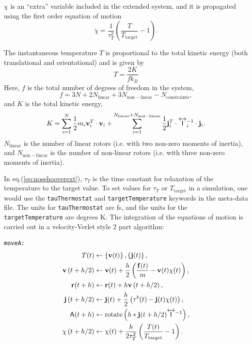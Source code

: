 \documentclass[letterpaper]{report}
\begin{document}
$\chi$ is an ``extra'' variable included in the extended system, and
it is propagated using the first order equation of motion
\begin{equation}
\dot{\chi} = \frac{1}{\tau_{T}^2} \left( \frac{T}{T_{\mathrm{target}}} - 1 \right).
\label{eq:nosehooverext}
\end{equation}

The instantaneous temperature $T$ is proportional to the total kinetic
energy (both translational and orientational) and is given by
\begin{equation}
T = \frac{2 K}{f k_B}
\end{equation}
Here, $f$ is the total number of degrees of freedom in the system,
\begin{equation}
f = 3 N + 2 N_{\mathrm{linear}} + 3 N_{\mathrm{non-linear}} - N_{\mathrm{constraints}},
\end{equation}
and $K$ is the total kinetic energy,
\begin{equation}
K = \sum_{i=1}^{N} \frac{1}{2} m_i {\bf v}_i^T \cdot {\bf v}_i +
\sum_{i=1}^{N_{\mathrm{linear}}+N_{\mathrm{non-linear}}}  \frac{1}{2} {\bf j}_i^T \cdot
\overleftrightarrow{\mathsf{I}}_i^{-1} \cdot {\bf j}_i.
\end{equation}
$N_{\mathrm{linear}}$ is the number of linear rotors (i.e. with two
non-zero moments of inertia), and $N_{\mathrm{non-linear}}$ is the
number of non-linear rotors (i.e. with three non-zero moments of
inertia).  

In eq.(\ref{eq:nosehooverext}), $\tau_T$ is the time constant for
relaxation of the temperature to the target value.  To set values for
$\tau_T$ or $T_{\mathrm{target}}$ in a simulation, one would use the
{\tt tauThermostat} and {\tt targetTemperature} keywords in the
meta-data file.  The units for {\tt tauThermostat} are fs, and the
units for the {\tt targetTemperature} are degrees K.   The integration
of the equations of motion is carried out in a velocity-Verlet style 2
part algorithm:

{\tt moveA:}
\begin{align*}
T(t) &\leftarrow \left\{{\bf v}(t)\right\}, \left\{{\bf j}(t)\right\} ,\\
%
{\bf v}\left(t + h / 2\right)  &\leftarrow {\bf v}(t) 
	+ \frac{h}{2} \left( \frac{{\bf f}(t)}{m} - {\bf v}(t)
	\chi(t)\right), \\
%
{\bf r}(t + h) &\leftarrow {\bf r}(t) 
	+ h {\bf v}\left(t + h / 2 \right) ,\\
%
{\bf j}\left(t + h / 2 \right)  &\leftarrow {\bf j}(t) 
	+ \frac{h}{2} \left( {\bf \tau}^b(t) - {\bf j}(t)
	\chi(t) \right) ,\\
%
\mathsf{A}(t + h) &\leftarrow \mathrm{rotate}
	\left(h * {\bf j}(t + h / 2) 
	\overleftrightarrow{\mathsf{I}}^{-1} \right) ,\\
%
\chi\left(t + h / 2 \right) &\leftarrow \chi(t) 
	+ \frac{h}{2 \tau_T^2} \left( \frac{T(t)}
	{T_{\mathrm{target}}} - 1 \right) .
\end{align*}
\end{document}
